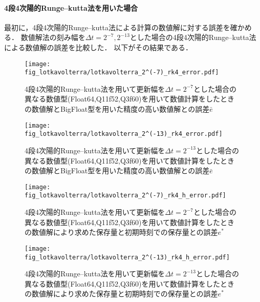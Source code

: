 \paragraph*{4段4次陽的Runge--kutta法を用いた場合}
最初に，4段4次陽的Runge--kutta法による計算の数値解に対する誤差を確かめる．
数値解法の刻み幅を$\Delta t = 2^{-7},2^{-13}$とした場合の4段4次陽的Runge--kutta法による数値解の誤差を比較した．
以下がその結果である．
\begin{figure}[H]
    \centering
    \begin{minipage}[b]{0.49\columnwidth}
        \centering
        \texttt{[image: fig\_lotkavolterra/lotkavolterra\_2^(-7)\_rk4\_error.pdf]}
        \caption{4段4次陽的Runge--kutta法を用いて更新幅を$\Delta t = 2^{-7}$とした場合の異なる数値型(Float64,Q11f52,Q3f60)を用いて数値計算をしたときの数値解とBigFloat型を用いた精度の高い数値解との誤差$\bar{e}$}
        \label{fig:lotkavolterra_2^(-7)_rk4_error}
    \end{minipage}
    \begin{minipage}[b]{0.49\columnwidth}
        \centering
        \texttt{[image: fig\_lotkavolterra/lotkavolterra\_2^(-13)\_rk4\_error.pdf]}
        \caption{4段4次陽的Runge--kutta法を用いて更新幅を$\Delta t =  2^{-13}$とした場合の異なる数値型(Float64,Q11f52,Q3f60)を用いて数値計算をしたときの数値解とBigFloat型を用いた精度の高い数値解との誤差$\bar{e}$}
        \label{fig:lotkavolterra_2^(-13)_rk4_error}
    \end{minipage}
\end{figure}
\begin{figure}[H]
    \centering
    \begin{minipage}[b]{0.49\columnwidth}
        \centering
        \texttt{[image: fig\_lotkavolterra/lotkavolterra\_2^(-7)\_rk4\_h\_error.pdf]}
        \caption{4段4次陽的Runge--kutta法を用いて更新幅を$\Delta t = 2^{-7}$とした場合の異なる数値型(Float64,Q11f52,Q3f60)を用いて数値計算をしたときの数値解により求めた保存量と初期時刻での保存量との誤差$e^{\ast}$}
        \label{fig:lotkavolterra_2^(-7)_rk4_h_error}
    \end{minipage}
    \begin{minipage}[b]{0.49\columnwidth}
        \centering
        \texttt{[image: fig\_lotkavolterra/lotkavolterra\_2^(-13)\_rk4\_h\_error.pdf]}
        \caption{4段4次陽的Runge--kutta法を用いて更新幅を$\Delta t =  2^{-13}$とした場合の異なる数値型(Float64,Q11f52,Q3f60)を用いて数値計算をしたときの数値解により求めた保存量と初期時刻での保存量との誤差$e^{\ast}$}
        \label{fig:lotkavolterra_2^(-13)_rk4_h_error}
    \end{minipage}
\end{figure}

